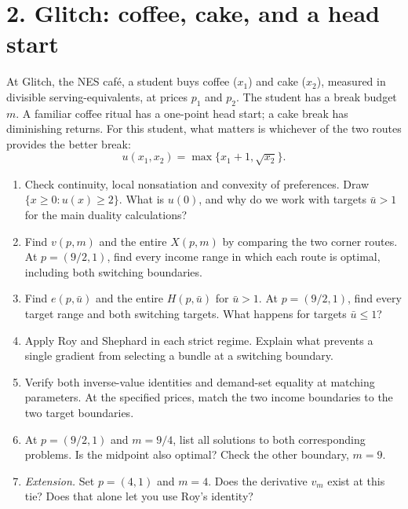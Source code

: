 \section*{2. Glitch: coffee, cake, and a head start}
At Glitch, the NES caf\'e, a student buys coffee ($x_1$) and cake ($x_2$),
measured in divisible serving-equivalents, at prices $p_1$ and $p_2$.
The student has a break budget $m$. A familiar coffee ritual has a one-point
head start; a cake break has diminishing returns. For this student, what
matters is whichever of the two routes provides the better break:
\[
 u(x_1,x_2)=\max\{x_1+1,\sqrt{x_2}\}.
\]
\begin{enumerate}[label=(\alph*)]
\item Check continuity, local nonsatiation and convexity of preferences.
Draw $\{x\ge0:u(x)\ge2\}$. What is $u(0)$, and why do we work with targets
$\bar u>1$ for the main duality calculations?
\item Find $v(p,m)$ and the entire $X(p,m)$ by comparing the two corner
routes. At $p=(9/2,1)$, find every income range in which each route is optimal,
including both switching boundaries.
\item Find $e(p,\bar u)$ and the entire $H(p,\bar u)$ for $\bar u>1$.
At $p=(9/2,1)$, find every target range and both switching targets.
What happens for targets $\bar u\le1$?
\item Apply Roy and Shephard in each strict regime. Explain what prevents
a single gradient from selecting a bundle at a switching boundary.
\item Verify both inverse-value identities and demand-set equality at matching
parameters. At the specified prices, match the two income boundaries to
the two target boundaries.
\item At $p=(9/2,1)$ and $m=9/4$, list all solutions to both corresponding
problems. Is the midpoint also optimal? Check the other boundary, $m=9$.
\item \emph{Extension.} Set $p=(4,1)$ and $m=4$. Does the derivative $v_m$
exist at this tie? Does that alone let you use Roy's identity?
\end{enumerate}
